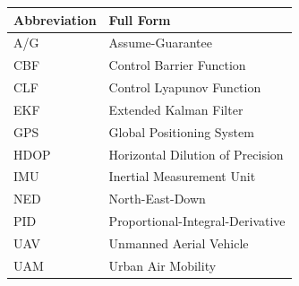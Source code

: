 \begin{longtable}{@{}p{3cm}p{10cm}@{}}
    \toprule
    \textbf{Abbreviation} & \textbf{Full Form} \\
    \midrule
    \endhead
    A/G & Assume-Guarantee \\
    CBF & Control Barrier Function \\
    CLF & Control Lyapunov Function \\
    EKF & Extended Kalman Filter \\
    GPS & Global Positioning System \\
    HDOP & Horizontal Dilution of Precision \\
    IMU & Inertial Measurement Unit \\
    NED & North-East-Down \\
    PID & Proportional-Integral-Derivative \\
    UAV & Unmanned Aerial Vehicle \\
    UAM & Urban Air Mobility \\
    \bottomrule
\end{longtable}

\newpage
